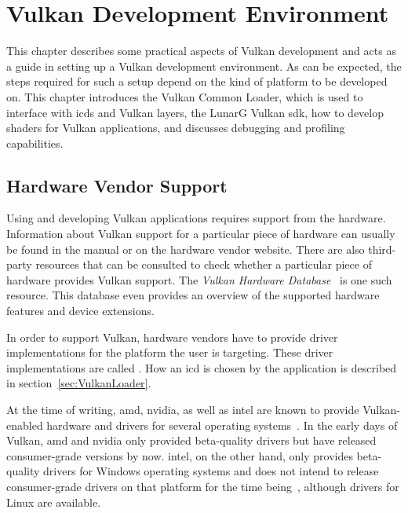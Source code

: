 
\chapter{Vulkan Development Environment}
\label{cha:EnvSetup}



  This chapter describes some practical aspects of Vulkan development and acts as a guide in setting up a Vulkan development environment.
  As can be expected, the steps required for such a setup depend on the kind of platform to be developed on.
  This chapter introduces the Vulkan Common Loader, which is used to interface with \glspl{icd} and Vulkan layers, the LunarG Vulkan \gls{sdk}, how to develop shaders for Vulkan applications, and discusses debugging and profiling capabilities.

  \section{Hardware Vendor Support}
  \label{sec:HardwareVendorSupport}
    Using and developing Vulkan applications requires support from the hardware.
    Information about Vulkan support for a particular piece of hardware can usually be found in the manual or on the hardware vendor website.
    There are also third-party resources that can be consulted to check whether a particular piece of hardware provides Vulkan support.
    The \textit{Vulkan Hardware Database}~\cite{vulkangpuinfo} is one such resource.
    This database even provides an overview of the supported hardware features and device extensions.

    In order to support Vulkan, hardware vendors have to provide driver implementations for the platform the user is targeting.
    These driver implementations are called .
    How an \gls{icd} is chosen by the application is described in section~\ref{sec:VulkanLoader}.


    At the time of writing, \gls{amd}, \gls{nvidia}, as well as \gls{intel} are known to provide Vulkan-enabled hardware and drivers for several operating systems~\cite{practicalvkgdc16}.
    In the early days of Vulkan, \gls{amd} and \gls{nvidia} only provided beta-quality \glspl{driver} but have released consumer-grade versions by now.
    \gls{intel}, on the other hand, only provides beta-quality \glspl{driver} for Windows operating systems and does not intend to release consumer-grade \glspl{driver} on that platform for the time being~\cite{intelvulkandriversonwindows}, although drivers for Linux are available.

